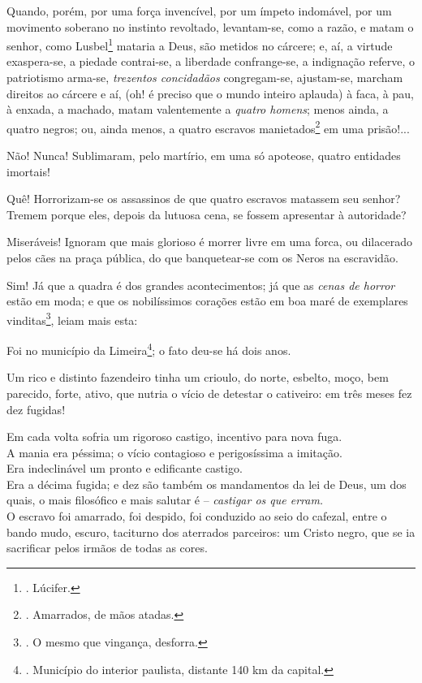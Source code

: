 Quando, porém, por uma força invencível, por um ímpeto indomável, por um
movimento soberano no instinto revoltado, levantam-se, como a razão, e
matam o senhor, como Lusbel\footnote{. Lúcifer.} mataria a Deus, são
metidos no cárcere; e, aí, a virtude exaspera-se, a piedade contrai-se,
a liberdade confrange-se, a indignação referve, o patriotismo arma-se,
\emph{trezentos concidadãos} congregam-se, ajustam-se, marcham direitos
ao cárcere e aí, (oh! é preciso que o mundo inteiro aplauda) à faca, à
pau, à enxada, a machado, matam valentemente a \emph{quatro homens};
menos ainda, a quatro negros; ou, ainda menos, a quatro escravos
manietados\footnote{. Amarrados, de mãos atadas.} em uma prisão!...

Não! Nunca! Sublimaram, pelo martírio, em uma só apoteose, quatro
entidades imortais!

Quê! Horrorizam-se os assassinos de que quatro escravos matassem seu
senhor? Tremem porque eles, depois da lutuosa cena, se fossem apresentar
à autoridade?

Miseráveis! Ignoram que mais glorioso é morrer livre em uma forca, ou
dilacerado pelos cães na praça pública, do que banquetear-se com os
Neros na escravidão.

Sim! Já que a quadra é dos grandes acontecimentos; já que as \emph{cenas
de horror} estão em moda; e que os nobilíssimos corações estão em boa
maré de exemplares vinditas\footnote{. O mesmo que vingança, desforra.},
leiam mais esta:

Foi no município da Limeira\footnote{. Município do interior paulista,
  distante 140 km da capital.}; o fato deu-se há dois anos.

Um rico e distinto fazendeiro tinha um crioulo, do norte, esbelto, moço,
bem parecido, forte, ativo, que nutria o vício de detestar o cativeiro:
em três meses fez dez fugidas!

Em cada volta sofria um rigoroso castigo, incentivo para nova fuga.\\
A mania era péssima; o vício contagioso e perigosíssima a imitação.\\
Era indeclinável um pronto e edificante castigo.\\
Era a décima fugida; e dez são também os mandamentos da lei de Deus, um
dos quais, o mais filosófico e mais salutar é -- \emph{castigar os que
erram.\\
} O escravo foi amarrado, foi despido, foi conduzido ao seio do cafezal,
entre o bando mudo, escuro, taciturno dos aterrados parceiros: um Cristo
negro, que se ia sacrificar pelos irmãos de todas as cores.

